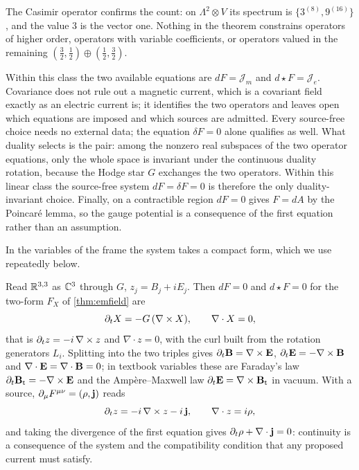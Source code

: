 The Casimir operator confirms the count: on $\Lambda^2\otimes V$ its spectrum is $\{3^{(8)},9^{(16)}\}$, and the value $3$ is the
vector one. Nothing in the theorem constrains operators of higher order, operators with variable coefficients, or operators valued
in the remaining $(\tfrac32,\tfrac12)\oplus(\tfrac12,\tfrac32)$.

\begin{corollary}
\label{cor:maxwellform}
Within this class the two available equations are $dF=\mathcal J_m$ and $d\star F=\mathcal J_e$. Covariance does not rule out a
magnetic current, which is a covariant field exactly as an electric current is; it identifies the two operators and leaves open
which equations are imposed and which sources are admitted. Every source-free choice needs no external data; the equation $\delta F=0$
alone qualifies as well. What duality selects is the pair: among the nonzero real subspaces of the two operator equations, only the whole
space is invariant under the continuous duality rotation, because the Hodge star $G$ exchanges the two operators. Within this linear class
the source-free system $dF=\delta F=0$ is therefore the only duality-invariant choice. Finally, on a contractible region $dF=0$ gives $F=dA$ by the Poincar\'e lemma, so the gauge potential is a consequence of
the first equation rather than an assumption.
\end{corollary}

In the variables of the frame the system takes a compact form, which we use repeatedly below.

\begin{proposition}
\label{prop:RS}
Read $\mathbb{R}^{3,3}$ as $\mathbb{C}^3$ through $G$, $z_j=B_j+iE_j$. Then $dF=0$ and $d\star F=0$ for the two-form $F_X$ of
\cref{thm:emfield} are
\begin{equation}
\label{eq:RS}
\partial_tX=-G\,(\nabla\times X),\qquad \nabla\cdot X=0,
\end{equation}
that is $\partial_tz=-i\,\nabla\times z$ and $\nabla\cdot z=0$, with the curl built from the rotation generators $L_i$. Splitting into the
two triples gives $\partial_t\mathbf B=\nabla\times\mathbf E$, $\partial_t\mathbf E=-\nabla\times\mathbf B$ and $\nabla\cdot\mathbf E=\nabla\cdot\mathbf B=0$; in textbook variables these
are Faraday's law $\partial_t\mathbf B_{\rm t}=-\nabla\times\mathbf E$ and the Amp\`ere--Maxwell law $\partial_t\mathbf E=\nabla\times\mathbf B_{\rm t}$ in vacuum. With a source,
$\partial_\mu F^{\mu\nu}=(\rho,\mathbf j)$ reads
\begin{equation}
\label{eq:RSsource}
\partial_tz=-i\,\nabla\times z-i\,\mathbf j,\qquad \nabla\cdot z=i\rho ,
\end{equation}
and taking the divergence of the first equation gives $\partial_t\rho+\nabla\cdot\mathbf j=0$: continuity is a consequence of the system and
the compatibility condition that any proposed current must satisfy.
\end{proposition}

